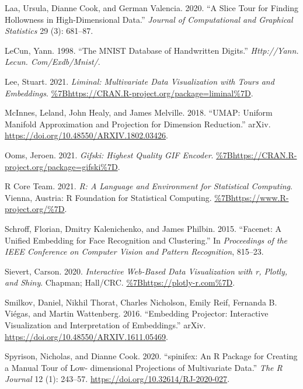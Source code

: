 \begin{CSLReferences}{1}{0}
\leavevmode{}%
Laa, Ursula, Dianne Cook, and German Valencia. 2020. {``A Slice Tour for Finding Hollowness in High-Dimensional Data.''} \emph{Journal of Computational and Graphical Statistics} 29 (3): 681--87.

\leavevmode{}%
LeCun, Yann. 1998. {``The MNIST Database of Handwritten Digits.''} \emph{Http://Yann. Lecun. Com/Exdb/Mnist/}.

\leavevmode{}%
Lee, Stuart. 2021. \emph{Liminal: Multivariate Data Visualization with Tours and Embeddings}. \url{\%7Bhttps://CRAN.R-project.org/package=liminal\%7D}.

\leavevmode{}%
McInnes, Leland, John Healy, and James Melville. 2018. {``UMAP: Uniform Manifold Approximation and Projection for Dimension Reduction.''} arXiv. \url{https://doi.org/10.48550/ARXIV.1802.03426}.

\leavevmode{}%
Ooms, Jeroen. 2021. \emph{Gifski: Highest Quality GIF Encoder}. \url{\%7Bhttps://CRAN.R-project.org/package=gifski\%7D}.

\leavevmode{}%
R Core Team. 2021. \emph{R: A Language and Environment for Statistical Computing}. Vienna, Austria: R Foundation for Statistical Computing. \url{\%7Bhttps://www.R-project.org/\%7D}.

\leavevmode{}%
Schroff, Florian, Dmitry Kalenichenko, and James Philbin. 2015. {``Facenet: A Unified Embedding for Face Recognition and Clustering.''} In \emph{Proceedings of the IEEE Conference on Computer Vision and Pattern Recognition}, 815--23.

\leavevmode{}%
Sievert, Carson. 2020. \emph{Interactive Web-Based Data Visualization with r, Plotly, and Shiny}. Chapman; Hall/CRC. \url{\%7Bhttps://plotly-r.com\%7D}.

\leavevmode{}%
Smilkov, Daniel, Nikhil Thorat, Charles Nicholson, Emily Reif, Fernanda B. Viégas, and Martin Wattenberg. 2016. {``Embedding Projector: Interactive Visualization and Interpretation of Embeddings.''} arXiv. \url{https://doi.org/10.48550/ARXIV.1611.05469}.

\leavevmode{}%
Spyrison, Nicholas, and Dianne Cook. 2020. {``{spinifex: An R Package for Creating a Manual Tour of Low- dimensional Projections of Multivariate Data}.''} \emph{{The R Journal}} 12 (1): 243--57. \url{https://doi.org/10.32614/RJ-2020-027}.


\end{CSLReferences}
